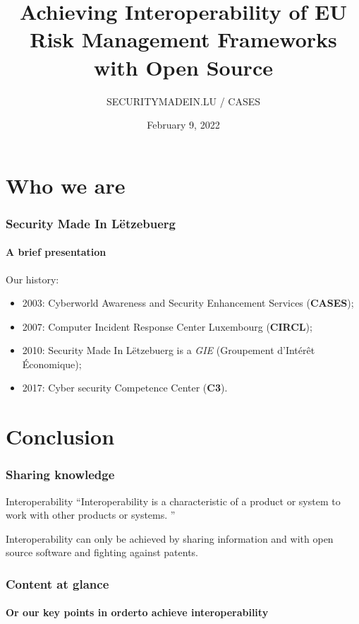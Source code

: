 \documentclass[]{beamer}
\title[Interoperability of EU Risk Management Frameworks]{Achieving Interoperability of EU Risk Management Frameworks with Open Source}
\author[Team CASES]{SECURITYMADEIN.LU / CASES}
\institute[]{\href{https://www.cases.lu}{Cyberworld Awareness and Security Enhancements Services}}
\date{February 9, 2022}
\begin{document}
\begin{frame}
  \titlepage
\end{frame}


%
%
\section*{Who we are}
\begin{frame}
  \frametitle{Security Made In Lëtzebuerg}
  \framesubtitle{A brief presentation}
  Our history:
  \begin{center}
    \begin{itemize}
      \item 2003: Cyberworld Awareness and Security Enhancement Services (\textbf{CASES});
      \item 2007: Computer Incident Response Center Luxembourg (\textbf{CIRCL});
      \item 2010: Security Made In Lëtzebuerg is a \textit{GIE} (Groupement d’Intérêt Économique);
      \item 2017: Cyber security Competence Center (\textbf{C3}).
    \end{itemize}
  \end{center}
\end{frame}


\section*{Conclusion}
\begin{frame}
  \frametitle{Sharing knowledge}
  \begin{block}{Interoperability}
    \textquotedblleft Interoperability is a characteristic of a product or system to work with other products or systems. \textquotedblright
  \end{block}
  \bigskip
  \begin{center}
    Interoperability can only be achieved by sharing information and with open source software and fighting against patents.
  \end{center}
\end{frame}


\setcounter{tocdepth}{1}
\begin{frame}
  \frametitle{Content at glance}
  \framesubtitle{Or our key points in orderto achieve interoperability}
  \tableofcontents
\end{frame}
\setcounter{tocdepth}{4}
\end{document}
